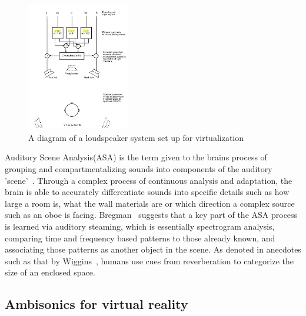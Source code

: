 \documentclass[paper=a4, fontsize=10pt, font=arial]{scrartcl} %
\numberwithin{equation}{section} %
\numberwithin{figure}{section} %
\numberwithin{table}{section} %
\begin{document}
\begin{figure}[H]
\centering
\includegraphics[width=0.4\textwidth]{virtualizationoverspeakers.JPG}
\centering
\caption{A diagram of a loudspeaker system set up for virtualization~\cite{rumsey2012spatial}}
\end{figure}

Auditory Scene Analysis(ASA) is the term given to the brains process of grouping and compartmentalizing sounds into components of the auditory 'scene'~\cite{rumsey2012spatial}. Through a complex process of continuous analysis and adaptation, the brain is able to accurately differentiate sounds into specific details such as how large a room is, what the wall materials are or which direction a complex source such as an oboe is facing. Bregman~\cite{Bregman1994} suggests that a key part of the ASA process is learned via auditory steaming, which is essentially spectrogram analysis, comparing time and frequency based patterns to those already known, and associating those patterns as another object in the scene. As denoted in anecdotes such as that by Wiggins~\cite{Wiggins2004}, humans use cues from reverberation to categorize the size of an enclosed space.

\subsection{Ambisonics for virtual reality}
\end{document}
